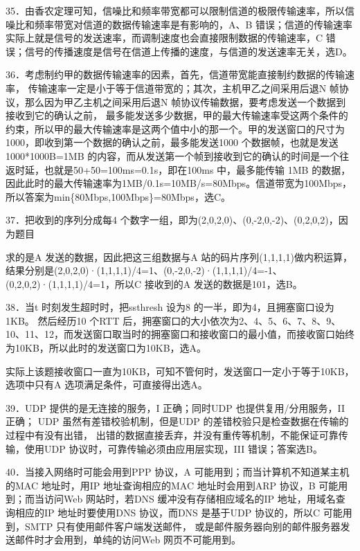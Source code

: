 \documentclass[UTF8,11pt]{ctexart}
\begin{document}
35．由香农定理可知，信噪比和频率带宽都可以限制信道的极限传输速率，所以信噪比和频率带宽对信道的数据传输速率是有影响的，A、B 错误；信道的传输速率实际上就是信号的发送速率，而调制速度也会直接限制数据的传输速率，C 错误；信号的传播速度是信号在信道上传播的速度，与信道的发送速率无关，选D。


36．考虑制约甲的数据传输速率的因素，首先，信道带宽能直接制约数据的传输速率， 传输速率一定是小于等于信道带宽的；其次，主机甲乙之间采用后退N 帧协议，那么因为甲乙主机之间采用后退N 帧协议传输数据，要考虑发送一个数据到接收到它的确认之前， 最多能发送多少数据，甲的最大传输速率受这两个条件的约束，所以甲的最大传输速率是这两个值中小的那一个。甲的发送窗口的尺寸为1000，即收到第一个数据的确认之前，最多能发送1000 个数据帧，也就是发送1000*1000B=1MB 的内容，而从发送第一个帧到接收到它的确认的时间是一个往返时延，也就是50+50=100ms=0.1s，即在100ms 中，最多能传输 1MB 的数据，因此此时的最大传输速率为1MB/0.1s=10MB/s=80Mbps。信道带宽为100Mbps， 所以答案为min\{80Mbps,100Mbps\}=80Mbps，选C。


37．把收到的序列分成每4 个数字一组，即为(2,0,2,0)、(0,-2,0,-2)、(0,2,0,2)，因为题目


求的是A 发送的数据，因此把这三组数据与A 站的码片序列(1,1,1,1)做内积运算，结果分别是(2,0,2,0)·(1,1,1,1)/4=1、(0,-2,0,-2)·(1,1,1,1)/4=-1、(0,2,0,2)·(1,1,1,1)/4=1，所以C 接收到的A 发送的数据是101，选B。


38．当t 时刻发生超时时，把ssthresh 设为8 的一半，即为4，且拥塞窗口设为1KB。 然后经历10 个RTT 后，拥塞窗口的大小依次为2、4、5、6、7、8、9、10、11、12，而发送窗口取当时的拥塞窗口和接收窗口的最小值，而接收窗口始终为10KB，所以此时的发送窗口为10KB，选A。


实际上该题接收窗口一直为10KB，可知不管何时，发送窗口一定小于等于10KB，选项中只有A 选项满足条件，可直接得出选A。


39．UDP 提供的是无连接的服务，I 正确；同时UDP 也提供复用/分用服务，II 正确； UDP 虽然有差错校验机制，但是UDP 的差错校验只是检查数据在传输的过程中有没有出错， 出错的数据直接丢弃，并没有重传等机制，不能保证可靠传输，使用UDP 协议时，可靠传输必须由应用层实现，III 错误；答案选B。


40．当接入网络时可能会用到PPP 协议，A 可能用到；而当计算机不知道某主机的MAC 地址时，用IP 地址查询相应的MAC 地址时会用到ARP 协议，B 可能用到；而当访问Web 网站时，若DNS 缓冲没有存储相应域名的IP 地址，用域名查询相应的IP 地址时要使用DNS 协议，而DNS 是基于UDP 协议的，所以C 可能用到，SMTP 只有使用邮件客户端发送邮件， 或是邮件服务器向别的邮件服务器发送邮件时才会用到，单纯的访问Web 网页不可能用到。
\end{document}
